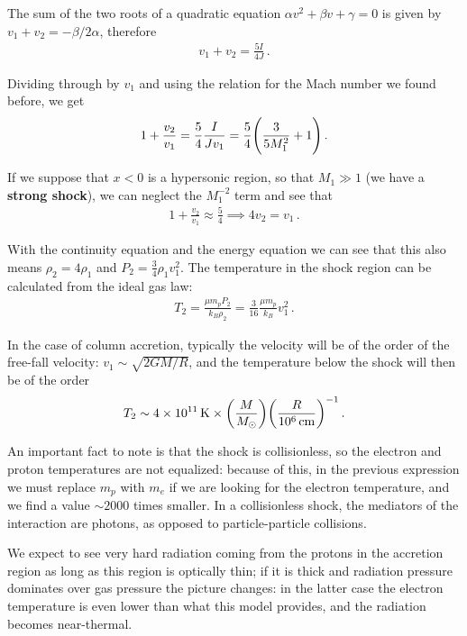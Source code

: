 \documentclass[main.tex]{subfiles}
\begin{document}
The sum of the two roots of a quadratic equation \(\alpha v^2 + \beta v + \gamma = 0 \) is given by \(v_1 + v_2 = - \beta / 2 \alpha \), therefore 
%
\begin{align}
v_1 + v_2 = \frac{5I}{4J}
\,.
\end{align}

Dividing through by \(v_1 \) and using the relation for the Mach number we found before, we get 
%
\begin{align}
1 + \frac{v_2}{v_1 } = \frac{5}{4} \frac{I}{J v_1 }
= \frac{5}{4} \qty( \frac{3}{5 M_1^2}  + 1)
\,.
\end{align}

If we suppose that \(x<0\) is a hypersonic region, so that \(M_1 \gg 1\) (we have a \textbf{strong shock}), we can neglect the \(M_1^{-2}\) term and see that 
%
\begin{align}
1 + \frac{v_2}{v_1 } \approx \frac{5}{4} \implies 4 v_2 = v_1 
\,.
\end{align}

With the continuity equation and the energy equation we can see that this also means \(\rho_2 = 4 \rho_1 \) and \(P_2 = \frac{3}{4} \rho_1 v_1^2\). 
The temperature in the shock region can be calculated from the ideal gas law: 
%
\begin{align}
T_2 = \frac{\mu m_p P_2 }{k_B \rho_2 } = \frac{3}{16} \frac{\mu m_p}{k_B} v_1^2
\,.
\end{align}

In the case of column accretion, typically the velocity will be of the order of the free-fall velocity: \(v_1 \sim \sqrt{ 2GM / R}\), and the temperature below the shock will then be of the order 
%
\begin{align}
T_2 \sim \SI{4e11}{K} \times \qty( \frac{M}{M_{\odot}} ) \qty( \frac{R}{\SI{e6}{cm}})^{-1}
\,.
\end{align}

An important fact to note is that the shock is collisionless, so the electron and proton temperatures are not equalized: because of this, in the previous expression we must replace \(m_p\) with \(m_e\) if we are looking for the electron temperature, and we find a value \(\sim 2000\) times smaller.
In a collisionless shock, the mediators of the interaction are photons, as opposed to particle-particle collisions.

We expect to see very hard radiation coming from the protons in the accretion region as long as this region is optically thin; if it is thick and radiation pressure dominates over gas pressure the picture changes: in the latter case the electron temperature is even lower than what this model provides, and the radiation becomes near-thermal. 
\end{document}
